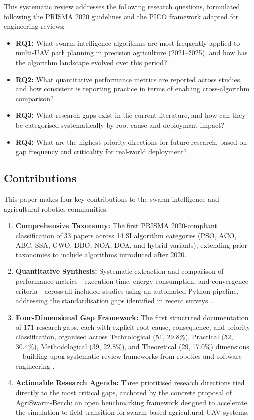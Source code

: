\documentclass[review,3p,times]{elsarticle}
\begin{document}
This systematic review addresses the following research questions, formulated following the PRISMA 2020 guidelines \cite{page2021} and the PICO framework adapted for engineering reviews:

\begin{itemize}
  \item \textbf{RQ1:} What swarm intelligence algorithms are most frequently applied to multi-UAV path planning in precision agriculture (2021--2025), and how has the algorithm landscape evolved over this period?
  \item \textbf{RQ2:} What quantitative performance metrics are reported across studies, and how consistent is reporting practice in terms of enabling cross-algorithm comparison?
  \item \textbf{RQ3:} What research gaps exist in the current literature, and how can they be categorised systematically by root cause and deployment impact?
  \item \textbf{RQ4:} What are the highest-priority directions for future research, based on gap frequency and criticality for real-world deployment?
\end{itemize}

\subsection{Contributions}

This paper makes four key contributions to the swarm intelligence and agricultural robotics communities:

\begin{enumerate}
    \item \textbf{Comprehensive Taxonomy:} The first PRISMA 2020-compliant classification of 33 papers across 14 SI algorithm categories (PSO, ACO, ABC, SSA, GWO, DBO, NOA, DOA, and hybrid variants), extending prior taxonomies \cite{chung2018,brambilla2013,puente2022,sharma2022} to include algorithms introduced after 2020.
    \item \textbf{Quantitative Synthesis:} Systematic extraction and comparison of performance metrics---execution time, energy consumption, and convergence criteria---across all included studies using an automated Python pipeline, addressing the standardisation gaps identified in recent surveys \cite{phung2021,pan2022,aitsaadi2022}.
    \item \textbf{Four-Dimensional Gap Framework:} The first structured documentation of 171 research gaps, each with explicit root cause, consequence, and priority classification, organised across Technological (51, 29.8\%), Practical (52, 30.4\%), Methodological (39, 22.8\%), and Theoretical (29, 17.0\%) dimensions---building upon systematic review frameworks from robotics and software engineering \cite{brambilla2013,bayindir2016}.
    \item \textbf{Actionable Research Agenda:} Three prioritised research directions tied directly to the most critical gaps, anchored by the concrete proposal of AgriSwarm-Bench: an open benchmarking framework designed to accelerate the simulation-to-field transition for swarm-based agricultural UAV systems.
\end{enumerate}
\end{document}
